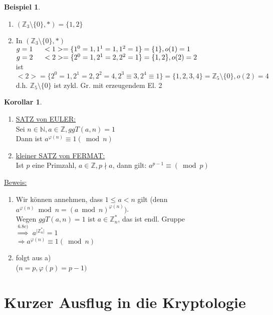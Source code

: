 \documentclass[a4paper,11pt]{article}
\newtheorem{bsp}[definition]{Beispiel}
\newtheorem{koro}[definition]{Korollar}
\newcommand{\hsp}{\hspace{5mm}}
\begin{document}
\newpage

\begin{bsp}
\end{bsp}
\begin{enumerate}[label=\alph*)]
	\item $(\mathbb{Z}_3\setminus\{0\},*)=\{1,2\}$ 
	\item In $(\mathbb{Z}_3\setminus\{0\},*)$ \\
	$g=1\hsp<1>=\{1^0=1,1^1=1,1^2=1\}=\{1\},o(1)=1$ \\
	$g=2\hsp<2>=\{2^0=1,2^1=2,2^2=1\}=\{1,2\},o(2)=2$ \\
	ist $<2>=\{2^0=1,2^1=2,2^2=4,2^3\equiv3,2^4\equiv1\}=\{1,2,3,4\}=\mathbb{Z}_5\setminus\{0\},o(2)=4$ \\
	d.h. $\mathbb{Z}_5\setminus\{0\}$ ist zykl. Gr. mit erzeugendem El. 2
\end{enumerate}

\begin{koro}
\end{koro}
\begin{enumerate}[label=\alph*)]
	\item\underline{SATZ von EULER:} \\
	Sei $n\in\mathbb{N},a\in\mathbb{Z},ggT(a,n)=1$ \\
	Dann ist $a^{\varphi(n)}\equiv1(\bmod n)$
	\item\underline{kleiner SATZ von FERMAT:} \\
	Ist $p$ eine Primzahl, $a\in\mathbb{Z}, p\nmid a$, dann gilt: $a^{p-1}\equiv(\bmod p)$
\end{enumerate}

\underline{Beweis:} \\
\begin{enumerate}[label=\alph*)]
	\item Wir können annehmen, dass $1\leq a<n$ gilt (denn $a^{\varphi(n)}\bmod n=(a\bmod n)^{\varphi(n)})$. \\
	Wegen $ggT(a,n)=1$ ist $a\in\mathbb{Z}_n^*$, das ist endl. Gruppe \\
	$\overset{6.8 c)}{\Rightarrow}$ $a^{\vert\mathbb{Z}_n^*\vert}=1$ \\
	$\Rightarrow a^{\varphi(n)}\equiv1(\bmod n)$ 
	\item folgt aus a) \\
	($n=p,\varphi(p)=p-1)$
\end{enumerate}

\newpage

\section{Kurzer Ausflug in die Kryptologie}
\end{document}
